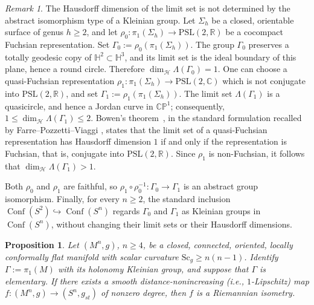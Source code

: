 \documentclass[12pt,oneside,a4paper]{article}
\newtheorem{proposition}[definition]{Proposition}
\theoremstyle{mytheorem}
\theoremstyle{remark}
\newtheorem{remark}[definition]{Remark}
\theoremstyle{definition}
\begin{document}
\begin{remark}
The Hausdorff dimension of the limit set is not determined by the abstract
isomorphism type of a Kleinian group. Let \(\Sigma_h\) be a closed,
orientable surface of genus \(h\geq2\), and let
$
\rho_0\colon\pi_1(\Sigma_h)\to \mathrm{PSL}(2,\mathbb R)
$
be a cocompact Fuchsian representation. Set
\(\Gamma_0:=\rho_0(\pi_1(\Sigma_h))\). The group \(\Gamma_0\) preserves a
totally geodesic copy of \(\mathbb H^2\subset\mathbb H^3\), and its limit
set is the ideal boundary of this plane, hence a round circle. Therefore
$\dim_{\mathcal H}\Lambda(\Gamma_0)=1.$ One can choose a quasi-Fuchsian representation
$\rho_1\colon\pi_1(\Sigma_h)\to\mathrm{PSL}(2,\mathbb C)$
which is not conjugate into \(\mathrm{PSL}(2,\mathbb R)\), and set
\(\Gamma_1:=\rho_1(\pi_1(\Sigma_h))\).
The limit set \(\Lambda(\Gamma_1)\) is a quasicircle, and hence a Jordan
curve in \(\mathbb{CP}^1\); consequently, $1\leq\dim_{\mathcal H}\Lambda(\Gamma_1)\leq2.$
Bowen's theorem~\cite[Theorem~2]{MR556580}, in the standard formulation
recalled by Farre--Pozzetti--Viaggi
\cite[\S~1, p.~2]{2024arXiv240720071F}, states that the limit set of
a quasi-Fuchsian representation has Hausdorff dimension \(1\) if and only
if the representation is Fuchsian, that is, conjugate into
\(\mathrm{PSL}(2,\mathbb R)\). Since \(\rho_1\) is non-Fuchsian, it follows
that $\dim_{\mathcal H}\Lambda(\Gamma_1)>1.$

Both \(\rho_0\) and \(\rho_1\) are faithful, so
$\rho_1\circ\rho_0^{-1}\colon\Gamma_0\to \Gamma_1$
is an abstract group isomorphism. Finally, for every \(n\geq2\), the standard inclusion
\(\operatorname{Conf}(S^2)\hookrightarrow\operatorname{Conf}(S^n)\)
regards \(\Gamma_0\) and \(\Gamma_1\) as Kleinian groups in
\(\operatorname{Conf}(S^n)\), without changing their limit sets or their
Hausdorff dimensions.
\end{remark}

















\begin{proposition}\label{Llarull}
Let \((M^{n},g)\), \(n\geq4\), be a closed, connected, oriented,
locally conformally flat manifold with scalar curvature
\(\mathrm{Sc}_{g}\geq n(n-1)\). Identify
\(\Gamma:=\pi_1(M)\) with its holonomy Kleinian group, and suppose that
\(\Gamma\) is elementary. If there exists a smooth distance-nonincreasing (i.e.,
\(1\)-Lipschitz) map
\(
f\colon(M^n,g)\to (S^{n},g_{st})
\)
of nonzero degree, then \(f\) is a Riemannian isometry.
\end{proposition}
\end{document}
